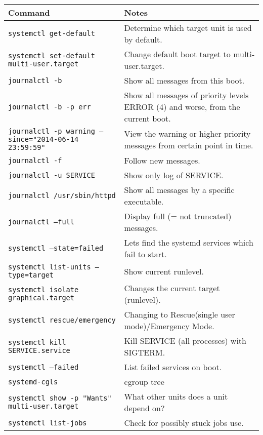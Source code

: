 \documentclass[a4paper]{article}
\begin{document}
\begin{center}
\vspace{6mm}

\begin{tabularx}{\textwidth}{ |l|X| }
\hline
\rowcolor[gray]{.8}
\bfseries Command                                       & \bfseries Notes \\\hline
\tt systemctl get-default                               & Determine which target unit is used by default. \\\hline
\tt systemctl set-default multi-user.target             & Change default boot target to multi-user.target. \\\hline
\tt journalctl -b                                       & Show all messages from this boot. \\\hline
\tt journalctl -b -p err                                & Show all messages of priority levels ERROR (4) and worse, from the current boot. \\\hline
\tt journalctl -p warning --since="2014-06-14 23:59:59" &  View the warning or higher priority messages from certain point in time. \\\hline
\tt journalctl -f                                       & Follow new messages. \\\hline
\tt journalctl -u SERVICE                               & Show only log of SERVICE. \\\hline
\tt journalctl /usr/sbin/httpd                          & Show all messages by a specific executable. \\\hline
\tt journalctl --full                                   & Display full (= not truncated) messages. \\\hline
\tt systemctl --state=failed                            & Lets find the systemd services which fail to start. \\\hline
\tt systemctl list-units --type=target                  & Show current runlevel. \\\hline
\tt systemctl isolate graphical.target                  & Changes the current target (runlevel). \\\hline
\tt systemctl rescue/emergency                          & Changing to Rescue(single user mode)/Emergency Mode. \\\hline
\tt systemctl kill SERVICE.service                      & Kill SERVICE (all processes) with SIGTERM. \\\hline
\tt systemctl --failed                                  & List failed services on boot. \\\hline
\tt systemd-cgls                                        & cgroup tree \\\hline
\tt systemctl show -p "Wants" multi-user.target         & What other units does a unit depend on? \\\hline
\tt systemctl list-jobs                                 & Check for possibly stuck jobs use. \\\hline
\end{tabularx}


\end{center}
\end{document}
